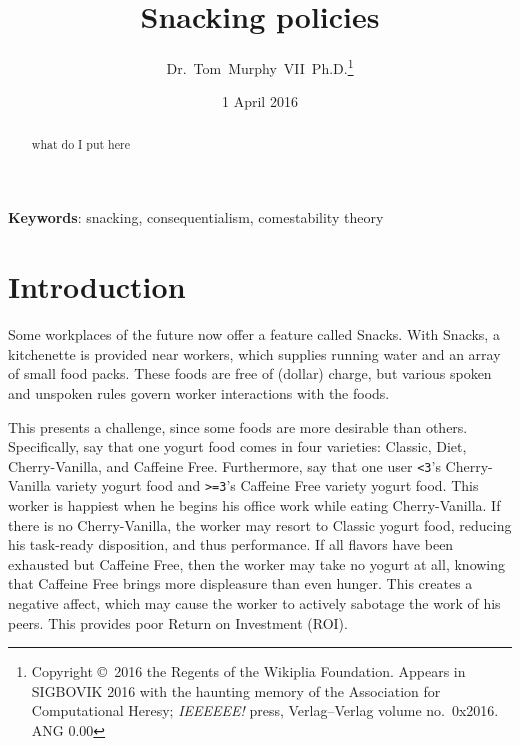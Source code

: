 \documentclass[twocolumn]{article}
\begin{document}
 

\title{Snacking policies}
\author{Dr.~Tom~Murphy~VII~Ph.D.\thanks{
    Copyright \copyright\ 2016 the Regents of the Wikiplia Foundation.
    Appears in SIGBOVIK 2016 with the haunting memory of the
    Association for Computational Heresy; {\em IEEEEEE!} press,
    Verlag--Verlag volume no.~0x2016. ANG 0.00} }

\renewcommand\>{$>$}
\newcommand\<{$<$}

\date{1 April 2016}

\maketitle

\begin{abstract}
what do I put here
\end{abstract}

\vspace{1em}
{\noindent \small {\bf Keywords}:
  snacking, consequentialism, comestability theory
}

\section{Introduction}

Some workplaces of the future now offer a feature called Snacks. With Snacks, a kitchenette is provided near workers, which supplies running water and an array of small food packs. These foods are free of (dollar) charge, but various spoken and unspoken rules govern worker interactions with the foods.

This presents a challenge, since some foods are more desirable than others. Specifically, say that one yogurt food comes in four varieties: Classic, Diet, Cherry-Vanilla, and Caffeine Free. Furthermore, say that one user \verb+<3+'s Cherry-Vanilla variety yogurt food and \verb+>=3+'s Caffeine Free variety yogurt food. This worker is happiest when he begins his office work while eating Cherry-Vanilla. If there is no Cherry-Vanilla, the worker may resort to Classic yogurt food, reducing his task-ready disposition, and thus performance. If all flavors have been exhausted but Caffeine Free, then the worker may take no yogurt at all, knowing that Caffeine Free brings more displeasure than even hunger. This creates a negative affect, which may cause the worker to actively sabotage the work of his peers. This provides poor Return on Investment (ROI).
\end{document}
